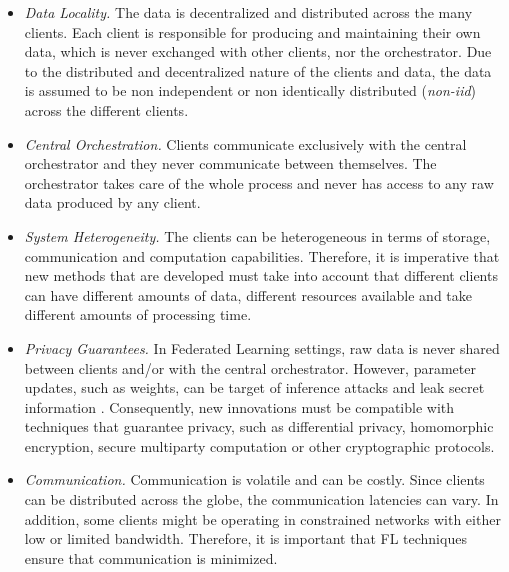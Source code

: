 \begin{itemize}
    \item \textit{Data Locality.} The data is decentralized and distributed across the many clients. Each client is responsible for producing and maintaining their own data, which is never exchanged with other clients, nor the orchestrator. Due to the distributed and decentralized nature of the clients and data, the data is assumed to be non independent or non identically distributed (\textit{non-iid}) across the different clients.
    
    \item \textit{Central Orchestration.} Clients communicate exclusively with the central orchestrator and they never communicate between themselves. The orchestrator takes care of the whole process and never has access to any raw data produced by any client.
    
    \item \textit{System Heterogeneity.} The clients can be heterogeneous in terms of storage, communication and computation capabilities. Therefore, it is imperative that new methods that are developed must take into account that different clients can have different amounts of data, different resources available and take different amounts of processing time.
    
    \item \textit{Privacy Guarantees.} In Federated Learning settings, raw data is never shared between clients and/or with the central orchestrator. However, parameter updates, such as weights, can be target of inference attacks and leak secret information \cite{10.1145/3298981}. Consequently, new innovations must be compatible with techniques that guarantee privacy, such as differential privacy, homomorphic encryption, secure multiparty computation or other cryptographic protocols.
    
    \item \textit{Communication.} Communication is volatile and can be costly. Since clients can be distributed across the globe, the communication latencies can vary. In addition, some clients might be operating in constrained networks with either low or limited bandwidth. Therefore, it is important that FL techniques ensure that communication is minimized.

\end{itemize}

